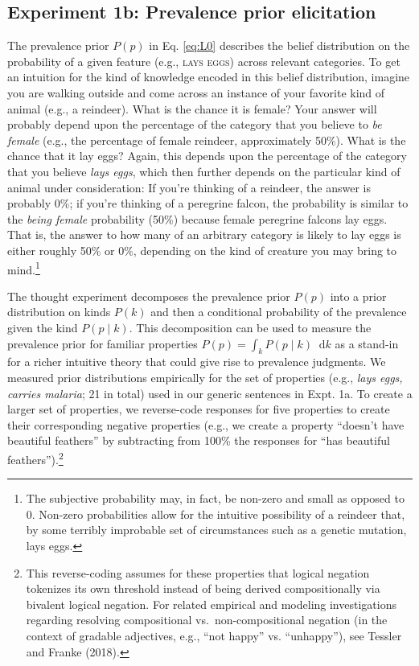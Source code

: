 \documentclass[english,,man,floatsintext]{apa6}
\let\rmarkdownfootnote\footnote%
\def\footnote{\protect\rmarkdownfootnote}
\theoremstyle{definition}
\theoremstyle{definition}
\theoremstyle{definition}
\theoremstyle{remark}
\begin{document}
\hypertarget{experiment-1b-prevalence-prior-elicitation}{%
\subsection{Experiment 1b: Prevalence prior
elicitation}\label{experiment-1b-prevalence-prior-elicitation}}

The prevalence prior \(P(p)\) in Eq. \ref{eq:L0} describes the belief
distribution on the probability of a given feature (e.g.,
\textsc{lays eggs}) across relevant categories. To get an intuition for
the kind of knowledge encoded in this belief distribution, imagine you
are walking outside and come across an instance of your favorite kind of
animal (e.g., a reindeer). What is the chance it is female? Your answer
will probably depend upon the percentage of the category that you
believe to \emph{be female} (e.g., the percentage of female reindeer,
approximately 50\%). What is the chance that it lay eggs? Again, this
depends upon the percentage of the category that you believe \emph{lays
eggs}, which then further depends on the particular kind of animal under
consideration: If you're thinking of a reindeer, the answer is probably
0\%; if you're thinking of a peregrine falcon, the probability is
similar to the \emph{being female} probability (50\%) because female
peregrine falcons lay eggs. That is, the answer to how many of an
arbitrary category is likely to lay eggs is either roughly 50\% or 0\%,
depending on the kind of creature you may bring to mind.\footnote{The
  subjective probability may, in fact, be non-zero and small as opposed
  to 0. Non-zero probabilities allow for the intuitive possibility of a
  reindeer that, by some terribly improbable set of circumstances such
  as a genetic mutation, lays eggs.}

The thought experiment decomposes the prevalence prior \(P(p)\) into a
prior distribution on kinds \(P(k)\) and then a conditional probability
of the prevalence given the kind \(P(p \mid k)\). This decomposition can
be used to measure the prevalence prior for familiar properties
\(P(p) = \int_{k} P(p \mid k) \mathop{}\!\mathrm{d}k\) as a stand-in for
a richer intuitive theory that could give rise to prevalence judgments.
We measured prior distributions empirically for the set of properties
(e.g., \emph{lays eggs, carries malaria}; 21 in total) used in our
generic sentences in Expt. 1a. To create a larger set of properties, we
reverse-code responses for five properties to create their corresponding
negative properties (e.g., we create a property \enquote{doesn't have
beautiful feathers} by subtracting from 100\% the responses for
\enquote{has beautiful feathers}).\footnote{This reverse-coding assumes
  for these properties that logical negation tokenizes its own threshold
  instead of being derived compositionally via bivalent logical
  negation. For related empirical and modeling investigations regarding
  resolving compositional vs.~non-compositional negation (in the context
  of gradable adjectives, e.g., \enquote{not happy} vs.
  \enquote{unhappy}), see Tessler and Franke (2018).}
\end{document}
